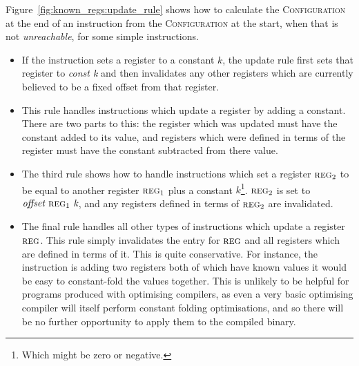 Figure~\ref{fig:known_regs:update_rule} shows how to calculate the
\textsc{Configuration} at the end of an instruction from the
\textsc{Configuration} at the start, when that is not
\textit{unreachable}, for some simple instructions.

\begin{itemize}
\item[\circled{1}] If the instruction sets a register to a constant $k$,
  the update rule first sets that register to \textit{const k} and then
  invalidates any other registers which are currently believed to be a
  fixed offset from that register.
\item[\circled{2}] This rule handles instructions which update a
  register by adding a constant.  There are two parts to this: the
  register which was updated must have the constant added to its
  value, and registers which were defined in terms of the register
  must have the constant subtracted from there value.
\item[\circled{3}] The third rule shows how to handle instructions
  which set a register $\textsc{reg}_2$ to be equal to another
  register $\textsc{reg}_1$ plus a constant $k$\footnote{Which might
    be zero or negative.}.  $\textsc{reg}_2$ is set to $\textit{offset
  }\textsc{reg}_1\textit{ k}$, and any registers defined in terms of
  $\textsc{reg}_2$ are invalidated.
\item[\circled{4}] The final rule handles all other types of
  instructions which update a register $\textsc{reg}$.  This rule
  simply invalidates the entry for $\textsc{reg}$ and all registers
  which are defined in terms of it.  This is quite conservative.  For
  instance, the instruction is adding two registers both of which have
  known values it would be easy to constant-fold the values together.
  This is unlikely to be helpful for programs produced with optimising
  compilers, as even a very basic optimising compiler will itself
  perform constant folding optimisations, and so there will be no
  further opportunity to apply them to the compiled binary.
\end{itemize}

